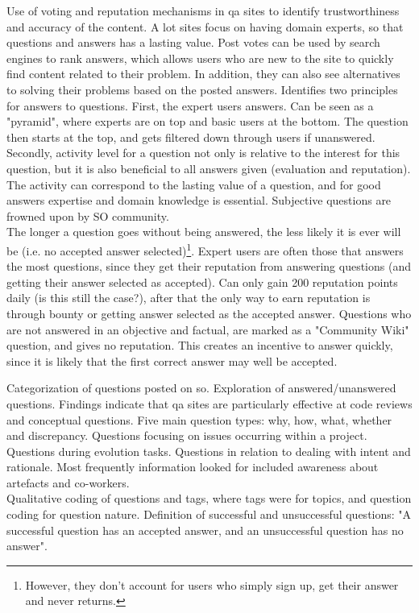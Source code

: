 Use of voting and reputation mechanisms in \gls{qa} sites to identify trustworthiness and accuracy of the content.
A lot sites focus on having domain experts, so that questions and answers has a lasting value. 
Post votes can be used by search engines to rank answers, which allows users who are new to the site to quickly find content related to their problem.
In addition, they can also see alternatives to solving their problems based on the posted answers.
Identifies two principles for answers to questions. First, the expert users answers. Can be seen as a "pyramid", where experts are on top and basic users at the bottom. 
The question then starts at the top, and gets filtered down through users if unanswered. 
Secondly, activity level for a question not only is relative to the interest for this question, but it is also beneficial to all answers given (evaluation and reputation).
The activity can correspond to the lasting value of a question, and for good answers expertise and domain knowledge is essential. 
Subjective questions are frowned upon by SO community. \\
The longer a question goes without being answered, the less likely it is ever will be (i.e. no accepted answer selected)\footnote{
	However, they don't account for users who simply sign up, get their answer and never returns.
}. 
Expert users are often those that answers the most questions, since they get their reputation from answering questions (and getting their answer selected as accepted). 
Can only gain 200 reputation points daily (is this still the case?), after that the only way to earn reputation is through bounty or getting answer selected as the accepted answer.
Questions who are not answered in an objective and factual, are marked as a "Community Wiki" question, and gives no reputation.
This creates an incentive to answer quickly, since it is likely that the first correct answer may well be accepted.
\cite{Anderson2012}









Categorization of questions posted on \gls{so}. 
Exploration of answered/unanswered questions. 
Findings indicate that \gls{qa} sites are particularly effective at code reviews and conceptual questions.
Five main question types: why, how, what, whether and discrepancy. 
Questions focusing on issues occurring within a project.
Questions during evolution tasks. 
Questions in relation to dealing with intent and rationale.
Most frequently information looked for included awareness about artefacts and co-workers. \\
Qualitative coding of questions and tags, where tags were for topics, and question coding for question nature. 
Definition of successful and unsuccessful questions: "A successful question has an accepted answer, and an unsuccessful question has no answer".
\cite{Treude2011}




